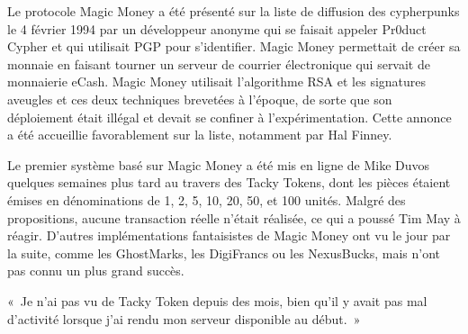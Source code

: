 Le protocole Magic Money a été présenté sur la liste de diffusion des cypherpunks le 4 février 1994 par un développeur anonyme qui se faisait appeler Pr0duct Cypher et qui utilisait PGP pour s'identifier. Magic Money permettait de créer sa monnaie en faisant tourner un serveur de courrier électronique qui servait de monnaierie eCash. Magic Money utilisait l'algorithme RSA et les signatures aveugles et ces deux techniques brevetées à l'époque, de sorte que son déploiement était  illégal et devait se confiner à l'expérimentation. Cette annonce a été accueillie favorablement sur la liste, notamment par Hal Finney.

Le premier système basé sur Magic Money a été mis en ligne de Mike Duvos quelques semaines plus tard au travers des Tacky Tokens, dont les pièces étaient émises en dénominations de 1, 2, 5, 10, 20, 50, et 100 unités. Malgré des propositions, aucune transaction réelle n'était réalisée, ce qui a poussé Tim May à réagir. D'autres implémentations fantaisistes de Magic Money ont vu le jour par la suite, comme les GhostMarks, les DigiFrancs ou les NexusBucks, mais n'ont pas connu un plus grand succès.

«~Je n'ai pas vu de Tacky Token depuis des mois, bien qu'il y avait pas mal d'activité lorsque j'ai rendu mon serveur disponible au début.~» 

